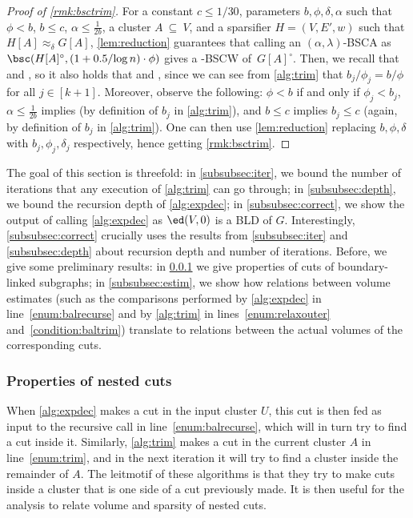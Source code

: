 \begin{proof}[Proof of \cref{rmk:bsctrim}]
For  a constant $c \le 1/30$, parameters $b, \phi, \delta,\alpha$ such that $\phi < b$, $b \le c$, $ \alpha \le \frac{1}{2b}$, a cluster $A~\subseteq~V$, and a sparsifier  $H=(V,E',w)$ such that $H[A] \approx_\delta G[A]$, \cref{lem:reduction} guarantees that calling an $(\alpha,\lambda)$-BSCA as $\bsc(H[A]^\circ, (1+0.5/{\log n}) \cdot \phi)$ gives a  -BSCW of~$G[A]^\circ$. Then, we recall that  and , so it also holds that  and , since we can see from \cref{alg:trim} that $b_j/\phi_j=b/\phi$ for all $j \in [k+1]$. Moreover, observe the following: $\phi < b$ if and only if $\phi_j < b_j$, $ \alpha \le \frac{1}{2b}$ implies  (by definition of $b_j$ in \cref{alg:trim}), and $b \le c$ implies $b_j \le c$ (again, by definition of $b_j$ in \cref{alg:trim}). One can then use \cref{lem:reduction} replacing $b,\phi,\delta$ with $b_j,\phi_j,\delta_j$ respectively, hence getting \cref{rmk:bsctrim}.
\end{proof}

\noindent
The goal of this section is threefold: in \cref{subsubsec:iter}, we bound the number of iterations that any execution of \cref{alg:trim} can go through; in \cref{subsubsec:depth}, we bound the recursion depth of \cref{alg:expdec}; in \cref{subsubsec:correct}, we show the output of calling \cref{alg:expdec} as $\ed(V,0)$ is a BLD of $G$. Interestingly,  \cref{subsubsec:correct} crucially uses the results from \cref{subsubsec:iter} and  \cref{subsubsec:depth} about recursion depth and number of iterations. Before, we give some preliminary results: in \cref{subsubsec:nested} we give properties of cuts of boundary-linked subgraphs; in \cref{subsubsec:estim}, we show how relations between volume estimates (such as the comparisons performed by \cref{alg:expdec} in line~\eqref{enum:balrecurse} and by \cref{alg:trim} in lines~\eqref{enum:relaxouter} and~\eqref{condition:baltrim}) translate to relations between the actual volumes of the corresponding cuts.

\subsubsection{Properties of nested cuts}
\label{subsubsec:nested}
When \cref{alg:expdec} makes a cut in the input cluster $U$, this cut is then fed as input to the recursive call in line~\eqref{enum:balrecurse}, which will in turn try to find a cut inside it. Similarly, \cref{alg:trim} makes a cut in the current cluster $A$ in line~\eqref{enum:trim}, and in the next iteration it will try to find a cluster inside the remainder of $A$. The leitmotif of these algorithms is that they try to make cuts inside a cluster that is one side of a cut previously made. It is then useful for the analysis to relate volume and sparsity of nested cuts.

